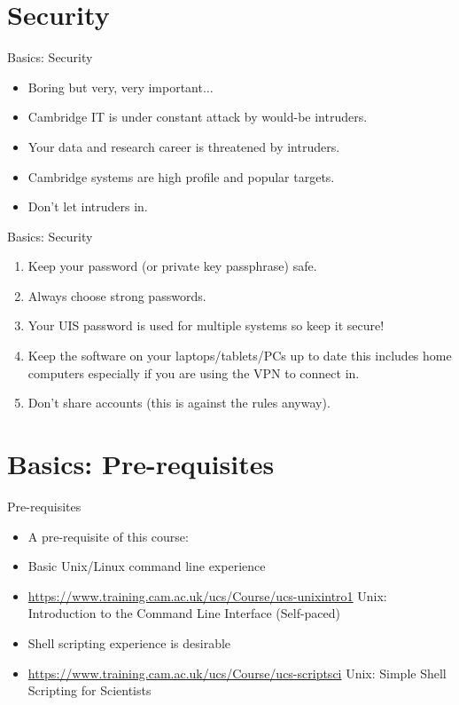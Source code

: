 \section{Security}
\begin{frame}{Basics: Security}
\begin{itemize}
\item{\alert{Boring but very, very important${}\ldots$}}
\pause
\item{Cambridge IT is under constant attack by would-be intruders.}
\pause
\item{Your data and research career is threatened by intruders.}
\pause
\item{\alert{Cambridge systems} are high profile and popular targets.}
\pause
\item{\alert{Don't let intruders in.}}
\end{itemize}
\end{frame}

\begin{frame}{Basics: Security}
\begin{enumerate}
\item{\alert{Keep your password (or private key passphrase) safe.}}
\pause
\item{\alert{Always choose strong passwords.}}
\pause
\item{\alert{Your UIS password is used for multiple systems so keep it secure!}}
\pause
\item{Keep the software on your laptops/tablets/PCs up to date this includes home computers especially if you are using the VPN to connect in.}
\pause
\item{Don't share accounts (this is against the rules anyway).}
\end{enumerate}
\end{frame}

\section{Basics: Pre-requisites}
\begin{frame}{Pre-requisites}
\begin{itemize}
\item{A pre-requisite of this course:}
\pause
\item{Basic Unix/Linux command line experience}
\item{\url{https://www.training.cam.ac.uk/ucs/Course/ucs-unixintro1} Unix: Introduction to the Command Line Interface (Self-paced)}
\pause
\item{Shell scripting experience is desirable}
\item{\url{https://www.training.cam.ac.uk/ucs/Course/ucs-scriptsci} Unix: Simple Shell Scripting for Scientists}
\end{itemize}
\end{frame}

